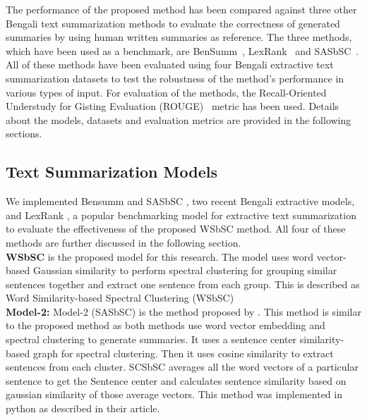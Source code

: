 The performance of the proposed method has been compared against three other Bengali text summarization methods to evaluate the correctness of generated summaries by using human written summaries as reference. The three methods, which have been used as a benchmark, are BenSumm~\cite{chowdhury-etal-2021-tfidf-clustering}, LexRank~\cite{Erkan-lexRank-2004} and SASbSC~\cite{roychowdhury-etal-2022-spectral-base}. All of these methods have been evaluated using four Bengali extractive text summarization datasets to test the robustness of the method's performance in various types of input. For evaluation of the methods, the Recall-Oriented Understudy for Gisting Evaluation (ROUGE)~\cite{lin-2004-rouge} metric has been used. Details about the models, datasets and evaluation metrics are provided in the following sections.

\subsection{Text Summarization Models}\label{subsec:text-summarization-models}
We implemented Bensumm \cite{chowdhury-etal-2021-tfidf-clustering} and SASbSC \cite{roychowdhury-etal-2022-spectral-base}, two recent Bengali extractive models, and LexRank \cite{Erkan-lexRank-2004}, a popular benchmarking model for extractive text summarization to evaluate the effectiveness of the proposed WSbSC method. All four of these methods are further discussed in the following section.\\

\textbf{WSbSC} is the proposed model for this research.
The model uses word vector-based Gaussian similarity to perform spectral clustering for grouping similar sentences together and extract one sentence from each group. This is described as Word Similarity-based Spectral Clustering (WSbSC)\\

\textbf{Model-2:} Model-2 (SASbSC) is the method proposed by \citeauthor{roychowdhury-etal-2022-spectral-base} \cite{roychowdhury-etal-2022-spectral-base}. This method is similar to the proposed method as both methods use word vector embedding and spectral clustering to generate summaries. It uses a sentence center similarity-based graph for spectral clustering. Then it uses cosine similarity to extract sentences from each cluster. SCSbSC averages all the word vectors of a particular sentence to get the Sentence center and calculates sentence similarity based on gaussian similarity of those average vectors. This method was implemented in python as described in their article.\\

